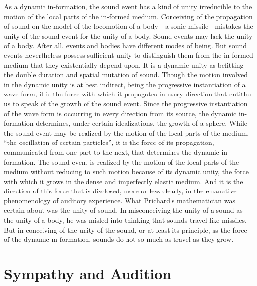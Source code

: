 As a dynamic in-formation, the sound event has a kind of unity irreducible to the motion of the local parts of the in-formed medium. Conceiving of the propagation of sound on the model of the locomotion of a body---a sonic missile---mistakes the unity of the sound event for the unity of a body. Sound events may lack the unity of a body. After all, events and bodies have different modes of being. But sound events nevertheless possess sufficient unity to distinguish them from the in-formed medium that they existentially depend upon. It is a dynamic unity as befitting the double duration and spatial mutation of sound. Though the motion involved in the dynamic unity is at best indirect, being the progressive instantiation of a wave form, it is the force with which it propagates in every direction that entitles us to speak of the growth of the sound event. Since the progressive instantiation of the wave form is occurring in every direction from its source, the dynamic in-formation determines, under certain idealizations, the growth of a sphere. While the sound event may be realized by the motion of the local parts of the medium, ``the oscillation of certain particles'', it is the force of its propagation, communicated from one part to the next, that determines the dynamic in-formation. The sound event is realized by the motion of the local parts of the medium without reducing to such motion because of its dynamic unity, the force with which it grows in the dense and imperfectly elastic medium. And it is the direction of this force that is disclosed, more or less clearly, in the emanative phenomenology of auditory experience. What Prichard's mathematician was certain about was the unity of sound. In misconceiving the unity of a sound as the unity of a body, he was misled into thinking that sounds travel like missiles. But in conceiving of the unity of the sound, or at least its principle, as the force of the dynamic in-formation, sounds do not so much as travel as they grow.


% 




\section{Sympathy and Audition} %
\label{sec:sympathy_and_audition}

